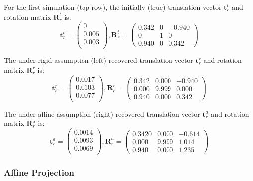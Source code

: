 \documentclass[11pt, a4paper, oneside, twocolumn]{report}
\renewcommand{\b}{\textbf}
\begin{document}
For the first simulation (top row), the initially (true) translation
vector $\b{t}_r^t$ and rotation matrix $\b{R}_r^t$ is:
\begin{equation}
  \b{t}_r^t=
  \begin{pmatrix}
    0 \\
    0.005 \\
    0.003 \\
  \end{pmatrix}
  ,  \b{R}_r^t=
  \begin{pmatrix}
    0.342 & 0 & -0.940 \\
    0 & 1 & 0 \\
    0.940 & 0 & 0.342
  \end{pmatrix}
\end{equation}

The under rigid assumption (left) recovered translation vector
$\b{t}_r^r$ and rotation matrix $\b{R}_r^r$ is:
\begin{equation}
  \b{t}_r^r=
  \begin{pmatrix}
    0.0017 \\
    0.0103 \\
    0.0077 \\
  \end{pmatrix}
  ,  \b{R}_r^r=
  \begin{pmatrix}
    0.342 & 0.000 & -0.940 \\
    0.000 & 9.999 & 0.000 \\
    0.940 & 0.000 & 0.342
  \end{pmatrix}
\end{equation}

The under affine assumption (right) recovered translation vector
$\b{t}_r^a$ and rotation matrix $\b{R}_r^a$ is:
\begin{equation}
  \b{t}_r^a=
  \begin{pmatrix}
    0.0014 \\
    0.0093 \\
    0.0069 \\
  \end{pmatrix}
  ,  \b{R}_r^a=
  \begin{pmatrix}
    0.3420 & 0.000 & -0.614 \\
    0.000 & 9.999 & 1.014 \\
    0.940 & 0.000 & 1.235
  \end{pmatrix}
\end{equation}

\subsubsection{Affine Projection}
\end{document}
